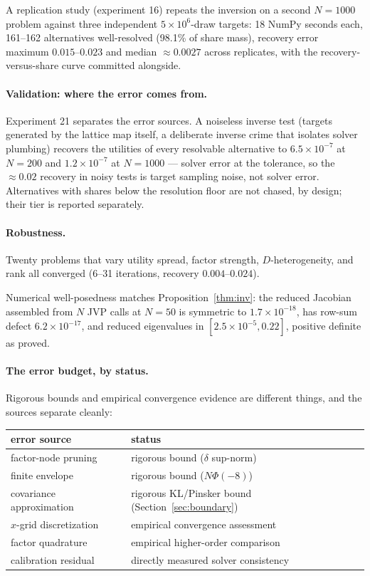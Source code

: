 \documentclass[12pt]{article}
\theoremstyle{remark}
\begin{document}
A replication study (experiment
16) repeats the inversion on a second $N=1000$ problem against three
independent $5\times10^6$-draw targets: 18 NumPy seconds each, 161--162
alternatives well-resolved (98.1\% of share mass), recovery error maximum
$0.015$--$0.023$ and median $\approx 0.0027$ across replicates, with the
recovery-versus-share curve committed alongside.

\paragraph{Validation: where the error comes from.} Experiment 21
separates the error sources. A noiseless inverse
test (targets generated by the lattice map itself, a deliberate inverse
crime that isolates solver plumbing) recovers the utilities of every
resolvable alternative to $6.5\times10^{-7}$ at $N=200$ and
$1.2\times10^{-7}$ at $N=1000$ --- solver error at the tolerance, so the
$\approx 0.02$ recovery in noisy tests is target sampling noise, not
solver error. Alternatives with shares below the resolution floor are not
chased, by design; their tier is reported separately.

\paragraph{Robustness.} Twenty problems that vary utility spread, factor
strength, $D$-heterogeneity, and rank all converged (6--31 iterations, recovery
$0.004$--$0.024$).

Numerical well-posedness matches
Proposition~\ref{thm:inv}: the reduced Jacobian assembled from $N$ JVP calls
at $N=50$ is symmetric to $1.7\times10^{-18}$, has row-sum defect
$6.2\times10^{-17}$, and reduced eigenvalues in $[2.5\times10^{-5},
0.22]$, positive definite as proved.

\paragraph{The error budget, by status.} Rigorous bounds and empirical
convergence evidence are different things, and the sources separate
cleanly:

\begin{center}
\footnotesize
\begin{tabular}{lp{6.2cm}}
\toprule
error source & status \\
\midrule
factor-node pruning & rigorous bound ($\delta$ sup-norm) \\
finite envelope & rigorous bound ($N\Phi(-8)$) \\
covariance approximation & rigorous KL/Pinsker bound (Section~\ref{sec:boundary}) \\
$x$-grid discretization & empirical convergence assessment \\
factor quadrature & empirical higher-order comparison \\
calibration residual & directly measured solver consistency \\
\bottomrule
\end{tabular}
\end{center}
\end{document}
